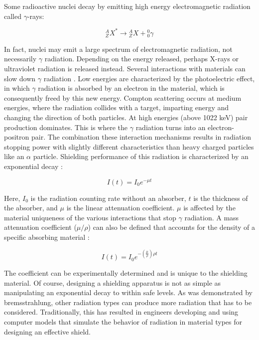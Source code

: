 Some radioactive nuclei decay by emitting high energy electromagnetic radiation called $\gamma$-rays:

\begin{equation}
{}^{A}_{Z}X^{*} \rightarrow {}^{A}_{Z}X + {}^{0}_{0}\gamma
\end{equation}

In fact, nuclei may emit a large spectrum of electromagnetic radiation, not necessarily $\gamma$ radiation. Depending on the energy released, perhaps X-rays or ultraviolet radiation is released instead. Several interactions with materials can slow down $\gamma$ radiation \cite{krane}. Low energies are characterized by the photoelectric effect, in which $\gamma$ radiation is absorbed by an electron in the material, which is consequently freed by this new energy. Compton scattering occurs at medium energies, where the radiation collides with a target, imparting energy and changing the direction of both particles. At high energies (above 1022 keV) pair production dominates. This is where the $\gamma$ radiation turns into an electron-positron pair. The combination these interaction mechanisms results in radiation stopping power with slightly different characteristics than heavy charged particles like an $\alpha$ particle. Shielding performance of this radiation is characterized by an exponential decay \cite{knoll}:

\begin{equation}
I(t) = I_{0}e^{-\mu t}
\end{equation}

Here, $I_{0}$ is the radiation counting rate without an absorber, $t$ is the thickness of the absorber, and $\mu$ is the linear attenuation coefficient. $\mu$ is affected by the material uniqueness of the various interactions that stop $\gamma$ radiation. A mass attenuation coefficient ($\mu/\rho$) can also be defined that accounts for the density of a specific absorbing material \cite{knoll}:

\begin{equation}
I(t) = I_{0}e^{-(\frac{\mu}{\rho})\rho t}
\label{eq:decay}
\end{equation}

The coefficient can be experimentally determined and is unique to the shielding material. Of course, designing a shielding apparatus is not as simple as manipulating an exponential decay to within safe levels. As was demonstrated by bremsstrahlung, other radiation types can produce more radiation that has to be considered. Traditionally, this has resulted in engineers developing and using computer models that simulate the behavior of radiation in material types for designing an effective shield.

